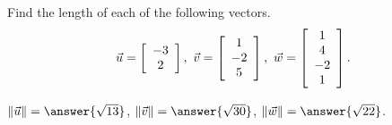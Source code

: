 \documentclass{ximera}
\author{Zack Reed}
\begin{document}
\begin{problem}
  Find the length of each of the following vectors.
\begin{equation*}
  \vect{u}=\startmat{c}-3\\2\stopmat, \quad
  \vect{v}=\startmat{c}1\\-2\\5\stopmat, \quad
  \vect{w}=\startmat{c}1\\4\\-2\\1\stopmat.
\end{equation*}

$\norm{\vect{u}} = \answer{\sqrt{13}}$, $\norm{\vect{v}} = \answer{\sqrt{30}}$,
    $\norm{\vect{w}} = \answer{\sqrt{22}}$.

\end{problem}
\end{document}
